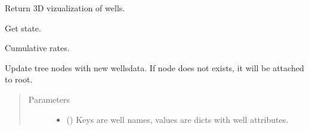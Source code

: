 \documentclass[letterpaper,10pt,english]{sphinxmanual}
\begin{document}
\begin{fulllineitems}

\begin{fulllineitems}
\label{\detokenize{api/wells:geology.src.wells.Wells.show_wells}}
Return 3D vizualization of wells.

\end{fulllineitems}


\begin{fulllineitems}
\label{\detokenize{api/wells:geology.src.wells.Wells.state}}
Get state.

\end{fulllineitems}


\begin{fulllineitems}
\label{\detokenize{api/wells:geology.src.wells.Wells.total_rates}}
Cumulative rates.

\end{fulllineitems}


\begin{fulllineitems}
\label{\detokenize{api/wells:geology.src.wells.Wells.update}}
Update tree nodes with new wellsdata. If node does not exists,
it will be attached to root.
\begin{quote}\begin{description}
\item[{Parameters}] \leavevmode\begin{itemize}
\item {} 
 () \textendash{} Keys are well names, values are dicts with well attributes.


\end{itemize}
\end{description}
\end{quote}
\end{fulllineitems}
\end{fulllineitems}
\end{document}
